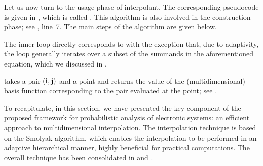 
Let us now turn to the usage phase of interpolant. The corresponding pseudocode
is given in , which is called . This algorithm is
also involved in the construction phase; see , line~7. The main
steps of the  algorithm are given below.

\begin{compactlist}

 The inner loop directly corresponds to
 with the exception that, due to adaptivity, the loop
generally iterates over a subset of the summands in the aforementioned equation,
which we discussed in .

  takes a pair $(\mathbf{i}, \mathbf{j})$ and a point and
returns the value of the (multidimensional) basis function corresponding to the
pair evaluated at the point; see .

\end{compactlist}

To recapitulate, in this section, we have presented the key component of the
proposed framework for probabilistic analysis of electronic systems: an
efficient approach to multidimensional interpolation. The interpolation
technique is based on the Smolyak algorithm, which enables the interpolation to
be performed in an adaptive hierarchical manner, highly beneficial for practical
computations. The overall technique has been consolidated in 
and .
